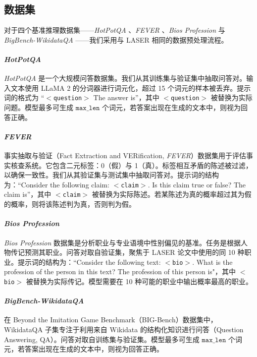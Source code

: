 \subsection{数据集} \label{datasets}
对于四个基准推理数据集——\textit{HotPotQA} \cite{yang2018HotPotQA}、\textit{FEVER} \cite{thorne2018FEVER}、\textit{Bios Profession} \cite{de2019bias} 与 \textit{BigBench-WikidataQA} \cite{bowman2015large}——我们采用与 LASER \cite{sharma2023truth} 相同的数据预处理流程。
\paragraph{\textit{HotPotQA}} 
\textit{HotPotQA} 是一个大规模问答数据集。我们从其训练集与验证集中抽取问答对。输入文本使用 LLaMA 2 \cite{llama2} 的分词器进行词元化，超过 15 个词元的样本被丢弃。提示词的格式为 ``$<$\texttt{question}$>$ The answer is”，其中 $<$\texttt{question}$>$ 被替换为实际问题。模型最多可生成 $\texttt{max\_len}$ 个词元，若答案出现在生成的文本中，则视为回答正确。
\paragraph{\textit{FEVER}}
事实抽取与验证（Fact Extraction and VERification, \textit{FEVER}）数据集用于评估事实核查系统。它包含二元标签：0（假）与 1（真）。标签相互矛盾的陈述被过滤，以确保一致性。我们从其验证集与测试集中抽取问答对。提示词的结构为：“Consider the following claim: $<$\texttt{claim}$>$. Is this claim true or false? The claim is”，其中 $<$\texttt{claim}$>$ 被替换为实际陈述。若某陈述为真的概率超过其为假的概率，则将该陈述判为真，否则判为假。
\paragraph{\textit{Bios Profession}}
\textit{Bios Profession} 数据集是分析职业与专业语境中性别偏见的基准。任务是根据人物传记预测其职业。问答对取自验证集，聚焦于 LASER 论文中使用的同 10 种职业。提示词的结构为：``Consider the following text: $<$\texttt{bio}$>$. What is the profession of the person in this text? The profession of this person is"，其中 $<$\texttt{bio}$>$ 被替换为实际传记。模型需要在 10 种可能的职业中输出概率最高的职业。
\paragraph{\textit{BigBench-WikidataQA}}
在 Beyond the Imitation Game Benchmark（BIG-Bench）数据集中，WikidataQA 子集专注于利用来自 Wikidata 的结构化知识进行问答（Question Answering, QA）。问答对取自训练集与验证集。模型最多可生成 $\texttt{max\_len}$ 个词元，若答案出现在生成的文本中，则视为回答正确。

